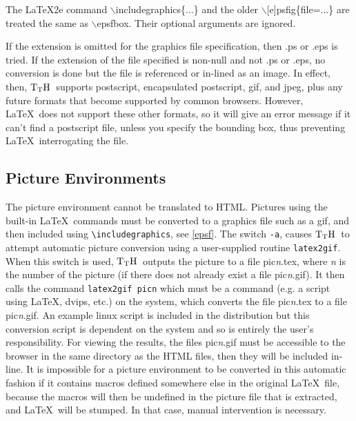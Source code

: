 \documentclass[12pt]{article}
\def\TtH{$\rm{}T_TH$}
\begin{document}
The \LaTeX2e command $\backslash$includegraphics\{...\} and the older
$\backslash$[e]psfig\{file=...\} are treated the same as $\backslash$epsfbox.
Their optional arguments are ignored.

If the extension is omitted for the graphics file specification, then
.ps or .eps is tried.  If the extension of the file specified is
non-null and not .ps or .eps, no conversion is done but the file
is referenced or in-lined as an image. In effect, then, \TtH\ supports
postscript, encapsulated postscript, gif, and jpeg, plus any future
formats that become supported by common browsers. However, \LaTeX\ does
not support these other formats, so it will give an error message if
it can't find a postscript file, unless you specify the bounding box,
thus preventing \LaTeX\ interrogating the file.

\subsection{Picture Environments}
\label{pict}
The picture environment cannot be translated to HTML. Pictures using
the built-in \LaTeX\ commands must be converted to a graphics file such
as a gif, and then included using \verb+\includegraphics+, see
\ref{epsf}. The switch \verb+-a+,
 causes \TtH\ to attempt automatic 
picture conversion using a user-supplied routine \verb+latex2gif+.
When this switch is used, \TtH\ outputs the picture to a file pic\textit{n}.tex,
where \textit n is the number of the picture (if there does not already exist
a file pic\textit{n}.gif). It then calls the command \verb+latex2gif picn+
which must be a command (e.g. a script using \LaTeX, dvips, etc.) on
the system, which converts the file pic\textit{n}.tex to a file pic\textit{n}.gif. An
example linux script is included in the distribution but this
conversion script is dependent on the system and so is entirely the
user's responsibility. For viewing the results, the files pic\textit{n}.gif
must be accessible to the browser in the same directory as the HTML
files, then they will be included in-line. It is impossible for a
picture environment to be converted in this automatic fashion if it
contains macros defined somewhere else in the original \LaTeX\ file,
because the macros will then be undefined in the picture file that is
extracted, and \LaTeX\ will be stumped. In that case, manual
intervention is necessary.
\end{document}
